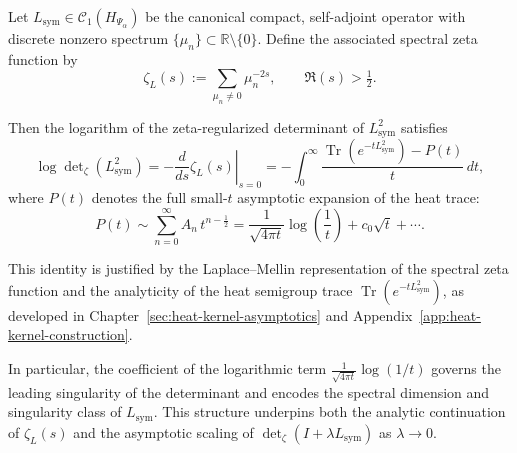 \begin{lemma}
\label{lem:log-derivative-determinant}
Let \( L_{\mathrm{sym}} \in \mathcal{C}_1(H_{\Psi_\alpha}) \) be the canonical compact, self-adjoint operator with discrete nonzero spectrum \( \{ \mu_n \} \subset \mathbb{R} \setminus \{0\} \). Define the associated spectral zeta function by
\[
\zeta_L(s) := \sum_{\mu_n \neq 0} \mu_n^{-2s}, \qquad \Re(s) > \tfrac{1}{2}.
\]

Then the logarithm of the zeta-regularized determinant of \( L_{\mathrm{sym}}^2 \) satisfies
\[
\log \det\nolimits_{\zeta}(L_{\mathrm{sym}}^2)
= -\left. \frac{d}{ds} \zeta_L(s) \right|_{s=0}
= -\int_0^\infty \frac{\operatorname{Tr}(e^{-t L_{\mathrm{sym}}^2}) - P(t)}{t} \, dt,
\]
where \( P(t) \) denotes the full small-\( t \) asymptotic expansion of the heat trace:
\[
P(t) \sim \sum_{n=0}^\infty A_n\, t^{n - \frac{1}{2}} = \frac{1}{\sqrt{4\pi t}} \log\left( \frac{1}{t} \right) + c_0 \sqrt{t} + \cdots.
\]

\medskip
\noindent
This identity is justified by the Laplace–Mellin representation of the spectral zeta function and the analyticity of the heat semigroup trace \( \operatorname{Tr}(e^{-t L_{\mathrm{sym}}^2}) \), as developed in Chapter~\ref{sec:heat-kernel-asymptotics} and Appendix~\ref{app:heat-kernel-construction}.

\medskip
\noindent
In particular, the coefficient of the logarithmic term \( \frac{1}{\sqrt{4\pi t}} \log(1/t) \) governs the leading singularity of the determinant and encodes the spectral dimension and singularity class of \( L_{\mathrm{sym}} \). This structure underpins both the analytic continuation of \( \zeta_L(s) \) and the asymptotic scaling of \( \det\nolimits_{\zeta}(I + \lambda L_{\mathrm{sym}}) \) as \( \lambda \to 0 \).
\end{lemma}
